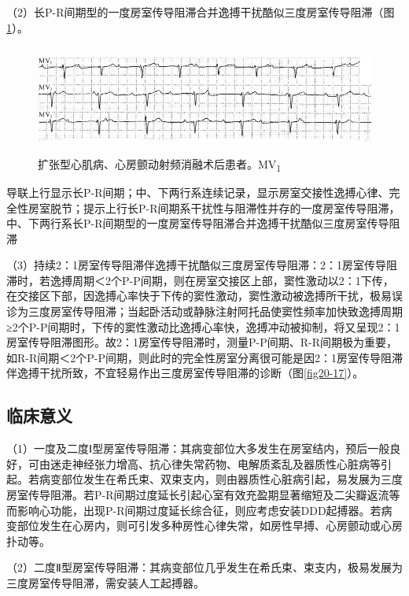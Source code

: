 （2）长P-R间期型的一度房室传导阻滞合并逸搏干扰酷似三度房室传导阻滞（图\ref{fig20-18}）。

\begin{figure}[!htbp]
 \centering
 \includegraphics[width=5.58333in,height=1.40625in]{./images/Image00347.jpg}
 \captionsetup{justification=centering}
 \caption{扩张型心肌病、心房颤动射频消融术后患者。MV\textsubscript{1}}
 \label{fig20-18}
  \end{figure} 
导联上行显示长P-R间期；中、下两行系连续记录，显示房室交接性逸搏心律、完全性房室脱节；提示上行长P-R间期系干扰性与阻滞性并存的一度房室传导阻滞，中、下两行系长P-R间期型的一度房室传导阻滞合并逸搏干扰酷似三度房室传导阻滞

（3）持续2：1房室传导阻滞伴逸搏干扰酷似三度房室传导阻滞：2：1房室传导阻滞时，若逸搏周期＜2个P-P间期，则在房室交接区上部，窦性激动以2：1下传，在交接区下部，因逸搏心率快于下传的窦性激动，窦性激动被逸搏所干扰，极易误诊为三度房室传导阻滞；当起卧活动或静脉注射阿托品使窦性频率加快致逸搏周期≥2个P-P间期时，下传的窦性激动比逸搏心率快，逸搏冲动被抑制，将又呈现2：1房室传导阻滞图形。故2：1房室传导阻滞时，测量P-P间期、R-R间期极为重要，如R-R间期＜2个P-P间期，则此时的完全性房室分离很可能是因2：1房室传导阻滞伴逸搏干扰所致，不宜轻易作出三度房室传导阻滞的诊断（图\ref{fig20-17}）。

\protect\hypertarget{text00027.htmlux5cux23subid331}{}{}

\subsection{临床意义}

（1）一度及二度Ⅰ型房室传导阻滞：其病变部位大多发生在房室结内，预后一般良好，可由迷走神经张力增高、抗心律失常药物、电解质紊乱及器质性心脏病等引起。若病变部位发生在希氏束、双束支内，则由器质性心脏病引起，易发展为三度房室传导阻滞。若P-R间期过度延长引起心室有效充盈期显著缩短及二尖瓣返流等而影响心功能，出现P-R间期过度延长综合征，则应考虑安装DDD起搏器。若病变部位发生在心房内，则可引发多种房性心律失常，如房性早搏、心房颤动或心房扑动等。

（2）二度Ⅱ型房室传导阻滞：其病变部位几乎发生在希氏束、束支内，极易发展为三度房室传导阻滞，需安装人工起搏器。

